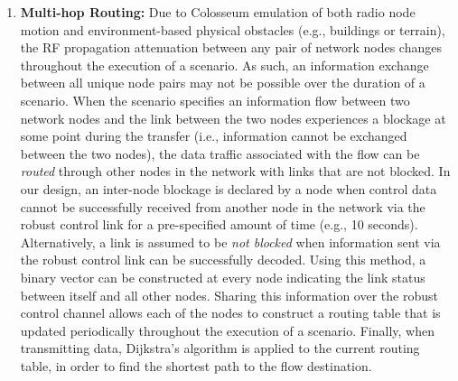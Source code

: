 \documentclass[11pt]{article}
\begin{document}
 \begin{enumerate}
     \item \textbf{Multi-hop Routing:} Due to Colosseum emulation of both radio node motion and environment-based physical obstacles (e.g., buildings or terrain), the RF propagation attenuation between any pair of network nodes changes throughout the execution of a scenario.  As such, an information exchange between all unique node pairs may not be possible over the duration of a scenario.  When the scenario specifies an information flow between two network nodes and the link between the two nodes experiences a blockage at some point during the transfer (i.e., information cannot be exchanged between the two nodes), the data traffic associated with the flow can be \emph{routed} through other nodes in the network with links that are not blocked.  In our design, an inter-node blockage is declared by a node when control data cannot be successfully received from another node in the network via the robust control link for a pre-specified amount of time (e.g., 10 seconds).  Alternatively, a link is assumed to be \emph{not blocked} when information sent via the robust control link can be successfully decoded. Using this method, a binary vector can be constructed at every node indicating the link status between itself and all other nodes.  Sharing this information over the robust control channel allows each of the nodes to construct a routing table that is updated periodically throughout the execution of a scenario. Finally, when transmitting data, Dijkstra's algorithm is applied to the current routing table, in order to find the shortest path to the flow destination.
     

\end{enumerate}
\end{document}
